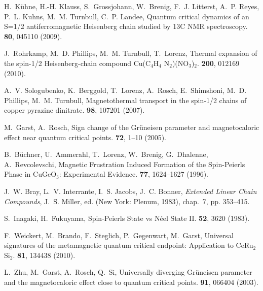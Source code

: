 \documentclass[12pt]{article}
\begin{document}
\begin{thebibliography}{10}
H.~K{\"{u}}hne, H.-H. Klauss, S.~Grossjohann, W.~Brenig, F.~J. Litterst, A.~P.
  Reyes, P.~L. Kuhns, M.~M. Turnbull, C.~P. Landee, {Quantum critical dynamics
  of an S=1/2 antiferromagnetic Heisenberg chain studied by 13C NMR
  spectroscopy}.
 {\bf 80}, 045110 (2009).

J.~Rohrkamp, M.~D. Phillips, M.~M. Turnbull, T.~Lorenz, {Thermal expansion of
  the spin-1/2 Heisenberg-chain compound Cu(C$_4$H$_4$ N$_2$)(NO$_3$)$_2$}.
 {\bf 200}, 012169
  (2010).

A.~V. Sologubenko, K.~Berggold, T.~Lorenz, A.~Rosch, E.~Shimshoni, M.~D.
  Phillips, M.~M. Turnbull, {Magnetothermal transport in the spin-1/2 chains of
  copper pyrazine dinitrate}.
 {\bf 98}, 107201 (2007).

M.~Garst, A.~Rosch, {Sign change of the Gr\"uneisen parameter and
  magnetocaloric effect near quantum critical points}.
  {\bf 72}, 1--10 (2005).

B.~B{\"{u}}chner, U.~Ammerahl, T.~Lorenz, W.~Brenig, G.~Dhalenne,
  A.~Revcolevschi, {Magnetic Frustration Induced Formation of the Spin-Peierls
  Phase in CuGeO$_3$: Experimental Evidence}.
 {\bf 77}, 1624--1627 (1996).

J.~W. Bray, L.~V. Interrante, I.~S. Jacobs, J.~C. Bonner, {\it Extended Linear
  Chain Compounds\/}, J.~S. Miller, ed. (New York: Plenum, 1983), chap.~7, pp.
  353--415.

S.~Inagaki, H.~Fukuyama, {Spin-Peierls State vs N{\'{e}}el State II}.
 {\bf 52}, 3620
  (1983).

F.~Weickert, M.~Brando, F.~Steglich, P.~Gegenwart, M.~Garst, {Universal
  signatures of the metamagnetic quantum critical endpoint: Application to
  CeRu$_{2}$Si$_{2}$}.
 {\bf 81}, 134438 (2010).

L.~Zhu, M.~Garst, A.~Rosch, Q.~Si, {Universally diverging Gr{\"{u}}neisen
  parameter and the magnetocaloric effect close to quantum critical points.}
 {\bf 91}, 066404 (2003).


\end{thebibliography}
\end{document}
